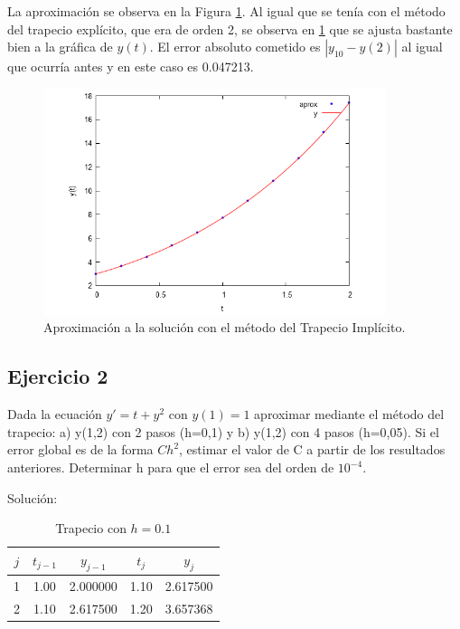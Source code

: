 \documentclass{article}
\theoremstyle{theorem-style}  %
\theoremstyle{definition-style}
\theoremstyle{example-style}
\begin{document}
La aproximación se observa en la Figura \ref{fig:aprox3}. Al igual que se tenía con el método del trapecio explícito, que era de orden 2, se observa en \ref{fig:aprox3} que se ajusta bastante bien a la gráfica de $y(t)$. El error absoluto cometido es $|y_{10} - y(2)|$ al igual que ocurría antes y en este caso es 0.047213.

	\begin{figure}[h]
		\centering
		\includegraphics[width=10cm]{./Images/ej1-3.png}
		\caption{Aproximación a la solución con el método del Trapecio Implícito.} 
		\label{fig:aprox3}
		
	\end{figure}
	
\subsection{Ejercicio 2} \label{ejtp2}

Dada la ecuación $y'=t+y^2$ con $y(1)=1$ aproximar mediante el método del trapecio: a) y(1,2) con 2 pasos (h=0,1) y b) y(1,2) con 4 pasos (h=0,05). Si el error global es de la forma $Ch^2$, estimar el valor de C a partir de los resultados anteriores. Determinar h para que el error sea del orden de $10^{-4}$.

Solución:

    \begin{table}[H]
		\centering
		\begin{tabular}{|| c | c | c | c | c ||}
			\hline
			\hline $j$ &  $t_{j-1}$ & $y_{j-1}$ & $t_j$ & $y_j$ \\
			\hline 1 & 1.00 & 2.000000 & 1.10 & 2.617500 \\
			\hline 2 & 1.10 & 2.617500 & 1.20 & 3.657368 \\
		\end{tabular}
		\caption{Trapecio con $h=0.1$}
		\label{table:trapecio-ej2}
	\end{table}
	
\end{document}
